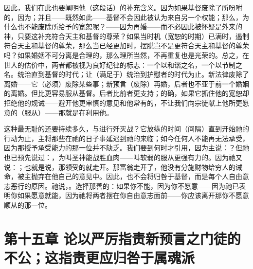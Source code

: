 因此，我们在此也要阐明他（这段话）的补充含义。因为如果基督废除了所吩咐的，因为；并且——既然如此——基督不会因此被认为来自另一个权能；那么，为什么也不能废除所给予的宽恕呢？——因为再婚——而不必因此被怀疑是外来的神，只要这补充符合天主和基督的尊荣？如果当时机（宽恕的时期）已满时，遏制符合天主和基督的尊荣，那么当已经更加时，摆脱岂不是更符合天主和基督的尊荣吗？如果婚姻不可分离是合理的，那么理所当然，不再重复也是光荣的。总之，在世人的估价中，两者都被视为良好纪律的标志：一个以和谐之名，一个以节制之名。统治直到基督的时代；让（满足于）统治到护慰者的时代为止。新法律废除了离婚——它（必须）废除某些事；新预言（废除）再婚，后者也不亚于前一个婚姻的离婚。但比更容易服从基督。后者比前者更支持；的确，如果它抓住他的宽恕却拒绝他的规诫——避开他更审慎的意见和他常有的，不让我们向宗徒献上他所更愿意的（服从）——那就是在利用他。\par

这种最无耻的还要持续多久，与进行歼灭战？它放纵的时间（间隔）直到开始祂的行动为止，主将那些在祂的日子事延迟到祂的来临；如今任何人不能再无法承受，因为那授予承受能力的那一位并不缺乏。我们要到何时才引用，因为主说：？但祂也已预先说过：，为叫圣神能战胜血肉——叫软弱的服从更强有力的。因为祂又说：；也就是说，那领受的就走开。那富翁走开了，他没有分施财物给穷人的诫命，被主抛弃在他自己的意见中。因此，也不会将归咎于基督，而是每个人自由意志恶行的原因。祂说，。选择那善的：如果你不能，因为你不愿意——因为祂已表明你如果愿意就能，因为祂将两者摆在你自由意志面前——你应该离开那你不愿意顺从的那一位。\par


\section{第十五章 论以严厉指责新预言之门徒的不公；这指责更应归咎于属魂派}

